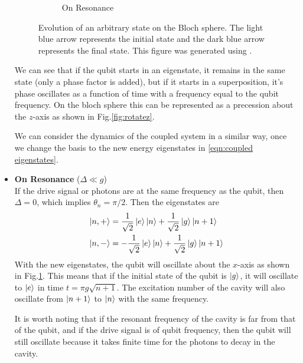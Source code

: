 \begin{itemize}
\begin{figure}
\begin{subfigure}[b]{0.45\textwidth}
\caption{On Resonance}
\label{fig:rotatex}
\end{subfigure}
\decoRule
\caption[Qubit Evolution on Bloch Sphere]{Evolution of an arbitrary state on the Bloch sphere. The light blue arrow represents the initial state and the dark blue arrow represents the final state. This figure was generated using \cite{Johansson2012}.}
\label{fig:rotatexz}
\end{figure}

We can see that if the qubit starts in an eigenstate, it remains in the same state (only a phase factor is added), but if it starts in a superposition, it's phase oscillates as a function of time with a frequency equal to the qubit frequency. On the bloch sphere this can be represented as a precession about the $z$-axis as shown in Fig.\ref{fig:rotatez}.

We can consider the dynamics of the coupled system in a similar way, once we change the basis to the new energy eigenstates in \ref{eqn:coupled eigenstates}.

\item \textbf{On Resonance} ($\Delta\ll g$)\\
If the drive signal or photons are at the same frequency as the qubit, then $\Delta=0$, which implies $\theta_n=\pi/2$. Then the eigenstates are
\begin{subequations}
\label{eqn:delta zero eigenstates}
\begin{align}
\ket{n,+} &= \frac{1}{\sqrt{2}}\ket{e}\ket{n}+\frac{1}{\sqrt{2}}\ket{g}\ket{n+1}\\
\ket{n,-} &= -\frac{1}{\sqrt{2}}\ket{e}\ket{n}+\frac{1}{\sqrt{2}}\ket{g}\ket{n+1}
\end{align}
\end{subequations}
With the new eigenstates, the qubit will oscillate about the $x$-axis as shown in Fig.\ref{fig:rotatex}. This means that if the initial state of the qubit is $\ket{g}$, it will oscillate to $\ket{e}$ in time $t=\pi g\sqrt{n+1}$. The excitation number of the cavity will also oscillate from $\ket{n+1}$ to $\ket{n}$ with the same frequency.

It is worth noting that if the resonant frequency of the cavity is far from that of the qubit, and if the drive signal is of qubit frequency, then the qubit will still oscillate because it takes finite time for the photons to decay in the cavity.


\end{itemize}
